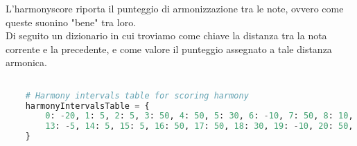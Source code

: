 \documentclass[a4paper,12pt]{report}
\begin{document}
L'harmonyscore riporta il punteggio di armonizzazione tra le note, ovvero come queste suonino "bene" tra loro. \\
Di seguito un dizionario in cui troviamo come chiave la distanza tra la nota corrente e la precedente, e come valore il punteggio assegnato a tale distanza armonica.

\begin{lstlisting}[language=Python]

    # Harmony intervals table for scoring harmony
    harmonyIntervalsTable = {
        0: -20, 1: 5, 2: 5, 3: 50, 4: 50, 5: 30, 6: -10, 7: 50, 8: 10, 9: 40, 10: -2, 11: -2, 12: 10,
        13: -5, 14: 5, 15: 5, 16: 50, 17: 50, 18: 30, 19: -10, 20: 50, 21: 10, 22: 40, 23: -2, 24: -2, 25: 10
    }

\end{lstlisting}
\end{document}
